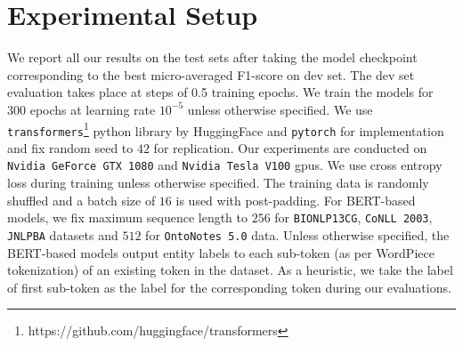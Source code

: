 \section{Experimental Setup}
We report all our results on the test sets after taking the model checkpoint corresponding to the best micro-averaged F1-score on dev set. The dev set evaluation takes place at steps of 0.5 training epochs. We train the models for $300$ epochs at learning rate $10^{-5}$ unless otherwise specified. We use \texttt{transformers}\footnote{https://github.com/huggingface/transformers} python library by HuggingFace and \texttt{pytorch} for implementation and fix random seed to $42$ for replication. Our experiments are conducted on \texttt{Nvidia GeForce GTX 1080} and \texttt{Nvidia Tesla V100} gpus. We use cross entropy loss during training unless otherwise specified. The training data is randomly shuffled and a batch size of $16$ is used with post-padding. For BERT-based models, we fix maximum sequence length to $256$ for \texttt{BIONLP13CG}, \texttt{CoNLL 2003}, \texttt{JNLPBA} datasets and $512$ for \texttt{OntoNotes 5.0} data. Unless otherwise specified, the BERT-based models output entity labels to each sub-token (as per WordPiece tokenization) of an existing token in the dataset. As a heuristic, we take the label of first sub-token as the label for the corresponding token during our evaluations.
